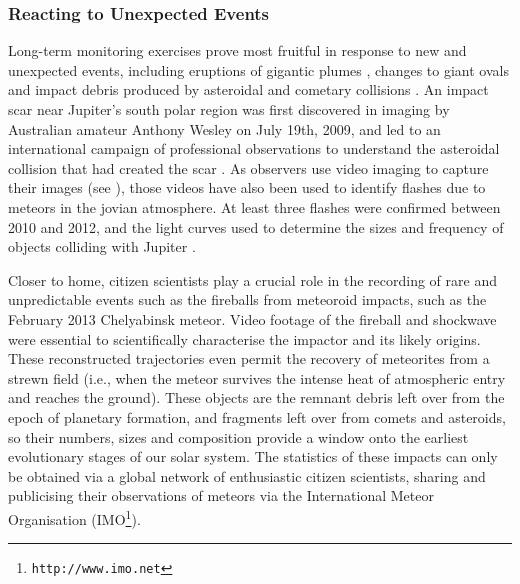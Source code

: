 \documentclass{ar2e}
\begin{document}





\subsubsection{Reacting to Unexpected Events}


Long-term monitoring exercises prove most fruitful in response to new and
unexpected events, including eruptions of gigantic plumes \citep{08sanchez,
11fletcher}, changes to giant ovals \citep{06simon-miller} and impact debris
produced by asteroidal and cometary collisions \citep{10hammel}.  An impact
scar near Jupiter's south polar region was first discovered in imaging by
Australian amateur Anthony Wesley on July 19th, 2009, and led to an
international campaign of professional observations to understand the
asteroidal collision that had created the scar
\citep[e.g.,][]{10depater,11orton}.  As observers use video imaging to capture
their images (see \Sref{}), those videos have also been used to
identify flashes due to meteors in the jovian atmosphere.  At least three
flashes were confirmed between 2010 and 2012, and the light curves used to
determine the sizes and frequency of objects colliding with Jupiter
\citep[e.g.,][]{10hueso}. 

Closer to home, citizen scientists play a crucial role in the recording of rare
and unpredictable events such as the fireballs from meteoroid impacts, such as
the February 2013 Chelyabinsk meteor.  Video footage of the fireball and
shockwave were essential to scientifically characterise the impactor and its
likely origins.   These
reconstructed trajectories even permit the recovery of meteorites from a strewn
field (i.e., when the meteor survives the intense heat of atmospheric entry and
reaches the ground).  These objects are the remnant debris left over from the
epoch of planetary formation, and fragments left over from comets and asteroids,
so their numbers, sizes and composition provide a window onto the earliest
evolutionary stages of our solar system.  The statistics of these impacts can
only be obtained via a global network of enthusiastic citizen scientists,
sharing and publicising their observations of meteors via the International
Meteor Organisation (IMO\footnote{\texttt{http://www.imo.net}}).  
\end{document}
